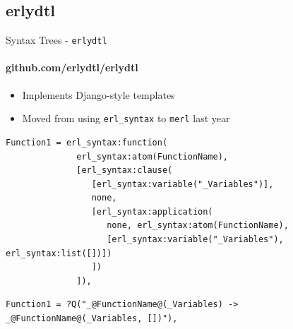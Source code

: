 \documentclass[c]{beamer}
\begin{document}
\subsection{erlydtl}
\begin{frame}[fragile]{Syntax Trees - \texttt{erlydtl}}
  \framesubtitle{github.com/erlydtl/erlydtl}
  \begin{itemize}
  \item Implements Django-style templates
  \item Moved from using \texttt{erl\_syntax} to \texttt{merl} last year
  \end{itemize}

  \begin{lstlisting}
Function1 = erl_syntax:function(
              erl_syntax:atom(FunctionName),
              [erl_syntax:clause(
                 [erl_syntax:variable("_Variables")],
                 none,
                 [erl_syntax:application(
                    none, erl_syntax:atom(FunctionName),
                    [erl_syntax:variable("_Variables"), erl_syntax:list([])])
                 ])
              ]),
  \end{lstlisting}
  \pause
  \begin{lstlisting}
Function1 = ?Q("_@FunctionName@(_Variables) -> _@FunctionName@(_Variables, [])"),
  \end{lstlisting}
\end{frame}

\end{document}
